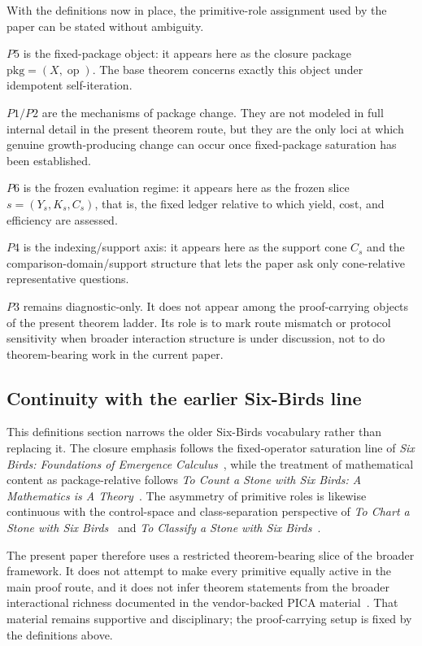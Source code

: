 With the definitions now in place, the primitive-role assignment used by the paper can be stated without ambiguity.

\(P5\) is the fixed-package object: it appears here as the closure package $\mathrm{pkg}=(X,\operatorname{op})$. The base theorem concerns exactly this object under idempotent self-iteration.

\(P1/P2\) are the mechanisms of package change. They are not modeled in full internal detail in the present theorem route, but they are the only loci at which genuine growth-producing change can occur once fixed-package saturation has been established.

\(P6\) is the frozen evaluation regime: it appears here as the frozen slice $s=(Y_s,K_s,C_s)$, that is, the fixed ledger relative to which yield, cost, and efficiency are assessed.

\(P4\) is the indexing/support axis: it appears here as the support cone $C_s$ and the comparison-domain/support structure that lets the paper ask only cone-relative representative questions.

\(P3\) remains diagnostic-only. It does not appear among the proof-carrying objects of the present theorem ladder. Its role is to mark route mismatch or protocol sensitivity when broader interaction structure is under discussion, not to do theorem-bearing work in the current paper.

\subsection*{Continuity with the earlier Six-Birds line}

This definitions section narrows the older Six-Birds vocabulary rather than replacing it. The closure emphasis follows the fixed-operator saturation line of \emph{Six Birds: Foundations of Emergence Calculus}~\cite{Tsiokos2026Foundations}, while the treatment of mathematical content as package-relative follows \emph{To Count a Stone with Six Birds: A Mathematics is A Theory}~\cite{Tsiokos2026ToCount}. The asymmetry of primitive roles is likewise continuous with the control-space and class-separation perspective of \emph{To Chart a Stone with Six Birds}~\cite{Tsiokos2026ToChart} and \emph{To Classify a Stone with Six Birds}~\cite{Tsiokos2026ToClassify}.

The present paper therefore uses a restricted theorem-bearing slice of the broader framework. It does not attempt to make every primitive equally active in the main proof route, and it does not infer theorem statements from the broader interactional richness documented in the vendor-backed PICA material~\cite{Tsiokos2026ToCreate}. That material remains supportive and disciplinary; the proof-carrying setup is fixed by the definitions above.

